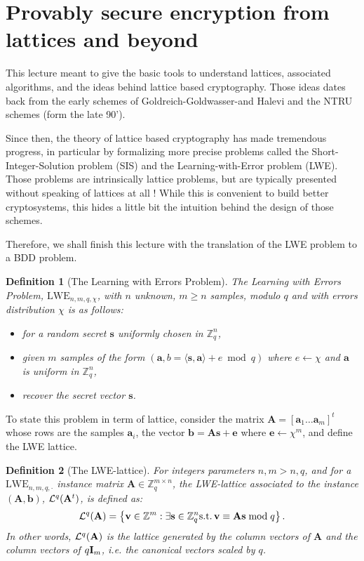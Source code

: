\documentclass[12pt]{article}
\renewcommand{\vec}{\mathbf}
\newcommand{\ps}[2]{\langle {#1}, {#2} \rangle}
\newcommand{\Z}{\mathbb Z}
\newtheorem{definition}{Definition}{\bfseries}{\upshape}
\begin{document}
\section{Provably secure encryption from lattices and beyond}

This lecture meant to give the basic tools to understand lattices, associated algorithms, and the ideas behind lattice based cryptography. Those ideas dates back from the early schemes of Goldreich-Goldwasser-and Halevi and the NTRU schemes (form the late 90').

Since then, the theory of lattice based cryptography has made tremendous progress, in particular by formalizing more precise problems called the Short-Integer-Solution problem (SIS) and the Learning-with-Error problem (LWE). Those problems are intrinsically lattice problems, but are typically presented without speaking of lattices at all ! While this is convenient to build better cryptosystems, this hides a little bit the intuition behind the design of those schemes.

Therefore, we shall finish this lecture with the translation of the LWE problem to a BDD problem. 

\begin{definition}[The Learning with Errors Problem]
  The Learning with Errors Problem, $\text{LWE}_{n,m,q,\chi}$, with $n$ unknown, $m\geq n$ samples, modulo $q$ and with errors distribution $\chi$ is as follows: 
  \begin{itemize}
    \item for a random secret $\vec s$ uniformly chosen in $\Z_q^n$, 
    \item given $m$ samples of the form $(\vec a,b = \ps{\vec s}{\vec a} + e \bmod q)$ where $e \leftarrow \chi$ and $\vec a$ is uniform in $\Z_q^n$, 
    \item recover the secret vector $\vec s$.
  \end{itemize}
\end{definition}

To state this problem in term of lattice, consider the matrix $\vec A = [\vec a_1 \dots \vec a_m]^t$ whose rows are the samples $\vec a_i$, the vector $\vec b = \vec A \vec s  + \vec e$ where $\vec e \leftarrow \chi^m$, and define the LWE lattice.

\begin{definition}[The LWE-lattice]
  For integers parameters $n,m>n ,q$, and for a $\text{LWE}_{n,m,q,\cdot}$ instance matrix $\vec A \in \Z_q^{m \times n}$, the LWE-lattice associated to the instance $(\vec A,\vec b)$, $\cL^{q}(\vec A^t)$, is defined as:
  \[ \cL^{q}(\vec A) = \left\{ \vec v \in \Z^m : \exists \vec s \in \Z_q^n \text{s.t.} \, \vec v \equiv \vec A \vec s \bmod q\right\} .\]
  In other words, $\cL^{q}(\vec A)$ is the lattice generated by the column vectors of $\vec A$ and the column vectors of $q \Id_m$, {\em i.e.} the canonical vectors scaled by $q$.
\end{definition}
\end{document}
